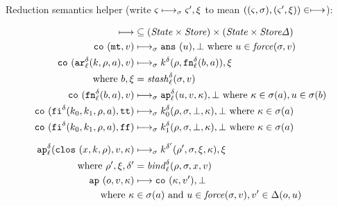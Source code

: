 \documentclass{llncs}
\begin{document}
Reduction semantics helper (write $\mstate \machstep_\msto \mstate',\msdiff$ to mean $((\mstate,\msto),(\mstate',\msdiff)) \in \machstep$):

\begin{gather*}
\begin{align*}
\machstep &\subseteq (\State \times \Store) \times (\State \times \StoreDelta) \\
\co{\kmt,\mval} &\machstep_\msto
\ans{\mvalx{u}},\bot
\text{ where } \mvalx{u} \in \force(\msto,\mval)
\\
\co{\kar[^\mcntr_\mlab]{\mcomp,\menv,\maddr},\mval} & \machstep_\msto
\mcomp^\mcntr(\menv,\kfn[^\mcntr_\mlab]{\maddralt,\maddr}), \msdiff
\\
\text{ where }\maddralt,\msdiff &= \stash_\mlab^\mcntr(\msto,\mval)
\\
\co{\kfn[^\mcntr_\mlab]{\maddralt,\maddr},\mval} & \machstep_\msto
\ap[^\mcntr_\mlab]{\mvalx{u},\mval,\mkont}, \bot
\text{ where } \mkont \in \msto(\maddr), \mvalx{u} \in \msto(\maddralt)
\\
\co{\kif[^\mcntr]{\mcompi0,\mcompi1,\menv,\maddr},\strue} & \machstep_\msto
\mcompi0^\mcntr(\menv,\msto,\bot,\mkont), \bot
\text{ where }\mkont\in\msto(\maddr)
\\
\co{\kif[^\mcntr]{\mcompi0,\mcompi1,\menv,\maddr},\sfalse} & \machstep_\msto
\mcompi1^\mcntr(\menv,\msto,\bot,\mkont), \bot
\text{ where }\mkont\in\msto(\maddr)
\\[2mm]
\ap[^\mcntr_\mlab]{\clos{\mvar,\mcomp,\menv},\mval,\mkont} & \machstep_\msto
\mcomp^{\mcntr'}(\menv',\msto,\msdiff,\mkont), \msdiff \\
\text{ where }\menv',\msdiff,\mcntr' &= \bind^\mcntr_\mlab(\menv,\msto,\mvar,\mval)
\\
\ap{\mop,\mval,\mkont} & \machstep
\co{\mkont,\mval'},\bot \\
\text{ where }\mkont &\in\msto(\maddr)
\text{ and } \mvalx{u} \in \force(\msto,\mval), \mval'\in\interpdelta(\mop,\mvalx{u})
\end{align*}
\end{gather*}
\end{document}
